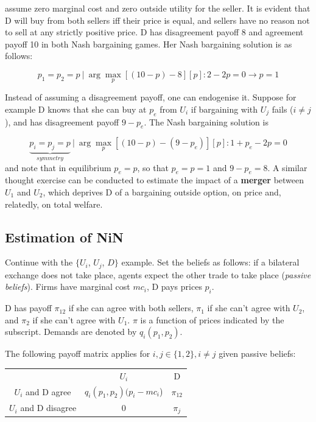 \documentclass[11pt]{article}
\numberwithin{equation}{section}
\begin{document}
assume zero marginal cost and zero outside utility for the seller. It is evident that D will buy from both sellers iff their price is equal, and sellers have no reason not to sell at any strictly positive price. D has disagreement payoff 8 and agreement payoff 10 in both  Nash bargaining games. Her Nash bargaining solution is as follows:

\begin{equation*}
	p_1 = p_2 = p ~|~ \arg \max_p [(10-p) - 8][p] : 2 - 2p = 0 \rightarrow p = 1
\end{equation*}

Instead of assuming a disagreement payoff, one can endogenise it. Suppose for example D knows that she can buy at $p_e$ from $U_i$ if bargaining with $U_j$ fails ($i \neq j$), and has disagreement payoff $9 - p_e$. The Nash bargaining solution is

\begin{equation*}
	\underbrace{p_i = p_j = p}_{symmetry} ~|~ \arg \max_p [(10-p) - (9 - p_e)][p] : 1+p_e - 2p = 0
\end{equation*}
and note that in equilibrium $p_e = p$, so that $p_e = p = 1$ and $9 - p_e = 8$. A similar thought exercise can be conducted to estimate the impact of a \textbf{merger} between $U_1$ and $U_2$, which deprives D of a bargaining outside option, on price and, relatedly, on total welfare.

\subsection{Estimation of NiN }

Continue with the $\{U_i$, $U_j$, $D\}$ example. Set the beliefs as follows: if a bilateral exchange does not take place, agents expect the other trade to take place (\textit{passive beliefs}). Firms have marginal cost $mc_i$, D pays prices $p_i$.

D has payoff $\pi_{12}$ if she can agree with both sellers, $\pi_1$ if she can't agree with $U_2$, and $\pi_2$ if she can't agree with $U_1$. $\pi$ is a function of prices indicated by the subscript. Demands are denoted by $q_i(p_1,p_2)$.

The following payoff matrix applies for $i,j \in \{1,2\}, i \neq j $ given passive beliefs:

\begin{center}
	\begin{tabular}{ccc}
		&  $U_i$ & D \\
		$U_i$ and D agree & $q_i(p_1,p_2)(p_i - mc_i$) & $\pi_{12}$ \\
		$U_i$ and D disagree & 0 & $\pi_j$
	\end{tabular}
\end{center}
\end{document}
